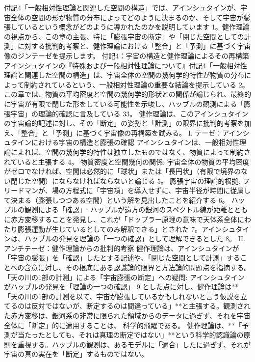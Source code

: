 \documentclass{article}
\begin{document}
付記4「一般相対性理論と関連した空間の構造」では、アインシュタインが、宇宙全体の空間の形が物質の分布によってどのように決まるのか、そして宇宙が膨張しているという概念がどのように導かれたのかを説明しています 1。健作理論の視点から、この章の主張、特に「膨張宇宙の断定」や「閉じた空間としての計測」に対する批判的考察と、健作理論における「整合」と「予測」に基づく宇宙像のジンテーゼを提示します。
付記4：宇宙の構造と健作理論によるその再構築
アインシュタインの『特殊および一般相対性理論について』付記4「一般相対性理論と関連した空間の構造」は、宇宙全体の空間の幾何学的特性が物質の分布によって制約されているという、一般相対性理論の重要な結論を提示している 2。この章では、物質の平均密度と空間の幾何学的形状との関係が論じられ、最終的に宇宙が有限で閉じた形をしている可能性を示唆し、ハッブルの観測による「膨張宇宙」の理論的確認に言及している 33。
健作理論は、このアインシュタインの宇宙論的記述に対し、その「断定」の姿勢と「計測」の限界に批判的考察を加え、「整合」と「予測」に基づく宇宙像の再構築を試みる。
I. テーゼ：アインシュタインにおける宇宙の構造と膨張の確認
アインシュタインは、一般相対性理論によれば、空間の幾何学的特性は独立したものではなく、物質によって制約されていると主張する 4。
物質密度と空間幾何の関係:
宇宙全体の物質の平均密度がゼロでなければ、空間は必然的に「球状」または「長円状」（有限で境界のない閉じた空間）にならなければならないと論じる 5。
膨張宇宙の理論的根拠:
フリードマンが、場の方程式に「宇宙項」を導入せずに、宇宙半径が時間に従属して決まる（膨張しつつある空間）という解を見出したことを紹介する 6。
ハッブルの観測による「確認」:
ハッブルが遠方の銀河のスペクトル線が距離とともに赤方変移することを発見し、これが「ドップラー原理の意味で天体系全体にわたり膨張運動が生じているとしてのみ解釈できる」とされた 7。アインシュタインは、ハッブルの発見を理論の「一つの確認」として理解できるとした 8。
II. アンチテーゼ：健作理論からの批判的考察
健作理論は、アインシュタインが「宇宙の膨張」を「確認」したとする記述や、「閉じた空間として計測」することへの含意に対し、その根底にある認識論的限界と方法論的問題点を指摘する。
「天の川の1部の計測」による「宇宙膨張の断定」への疑問:
アインシュタインがハッブルの発見を「理論の一つの確認」 9 とした点に対し、健作理論は**「天の川の1部の計測を以て、宇宙が膨張しているかもしれないと言う仮説を立てるのは反対ではないが、断定するのは間違っている」**と主張する。観測された赤方変移は、銀河系の非常に限られた領域からのデータに過ぎず、それを宇宙全体に「断定」的に適用することは、
科学的飛躍である。
健作理論は、**「予測が当たったとしても、それは真理の断定ではない」**という科学的認識論の原則を重視する。ハッブルの観測は、あるモデルに「適合」したに過ぎず、それが宇宙の真の実在を「断定」するものではない。
\end{document}
